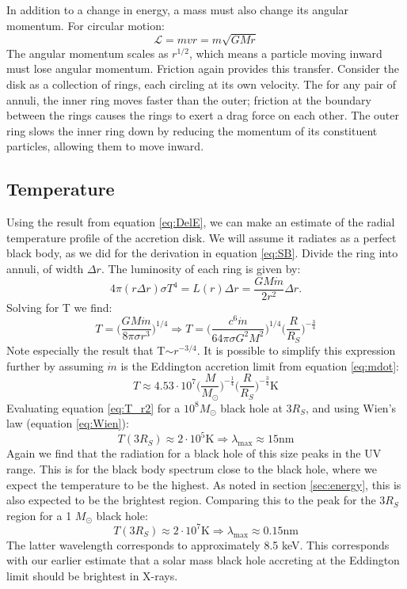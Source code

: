 \documentclass[11pt]{article}
\begin{document}
In addition to a change in energy, a mass must also change its angular momentum. For circular motion:
\begin{equation}
	\mathcal{L} = mvr = m\sqrt{GMr}
\end{equation}
The angular momentum scales as $r^{1/2}$, which means a particle moving inward must lose angular momentum. Friction again provides this transfer. Consider the disk as a collection of rings, each circling at its own velocity. The for any pair of annuli, the inner ring moves faster than the outer; friction at the boundary between the rings causes the rings to exert a drag force on each other. The outer ring slows the inner ring down by reducing the momentum of its constituent particles, allowing them to move inward.\\

\subsection{Temperature}
\noindent
Using the result from equation \ref{eq:DelE}, we can make an estimate of the radial temperature profile of the accretion disk. We will assume it radiates as a perfect black body, as we did for the derivation in equation \ref{eq:SB}. Divide the ring into annuli, of width $\Delta r$. The luminosity of each ring is given by:
\begin{equation}
 4 \pi (r \Delta r)\sigma T^{4}  = L(r) \Delta r = \frac{GM\dot{m} }{2r^2} \Delta r.
\end{equation}
Solving for T we find:
\begin{equation}
	T =  \Big(\frac{GM\dot{m}}{8 \pi \sigma r^{3}} \Big)^{1/4} \Rightarrow T = \Big(\frac{c^6\dot{m}}{64 \pi \sigma G^2 M^2} \Big)^{1/4} \Big(\frac{R}{R_S}\Big)^{-\frac{3}{4}}
	\label{eq:T_r1}
\end{equation}
Note especially the result that T$\sim r^{-3/4}$. It is possible to simplify this expression further by assuming $\dot{m}$ is the Eddington accretion limit from equation \ref{eq:mdot}:
\begin{equation}
	T \approx 4.53\cdot 10^7 \Big(\frac{M}{M_{\odot}}\Big)^{-\frac{1}{4}}\Big(\frac{R}{R_S}\Big)^{-\frac{3}{4}} \mathrm{K}
	\label{eq:T_r2}
\end{equation}
\noindent
Evaluating equation \ref{eq:T_r2} for a $10^8 M_{\odot}$ black hole at 3$R_S$, and using Wien's law (equation \ref{eq:Wien}):
$$T(3R_S) \approx 2\cdot 10^5 \mathrm{K} \Rightarrow \lambda_{\mathrm{max}} \approx 15 \mathrm{nm}$$
Again we find that the radiation for a black hole of this size peaks in the UV range. This is for the black body spectrum close to the black hole, where we expect the temperature to be the highest. As noted in section \ref{sec:energy}, this is also expected to be the brightest region. Comparing this to the peak for the 3$R_S$ region for a 1 $M_{\odot}$ black hole:
$$T(3R_S) \approx 2\cdot 10^7 \mathrm{K} \Rightarrow \lambda_{\mathrm{max}} \approx 0.15 \mathrm{nm}$$
The latter wavelength corresponds to approximately 8.5 keV. This corresponds with our earlier estimate that a solar mass black hole accreting at the Eddington limit should be brightest in X-rays.\\
\end{document}
